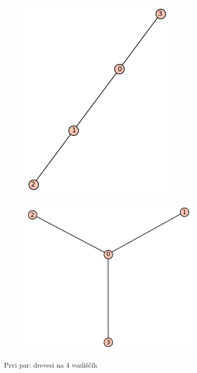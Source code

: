 \documentclass[12pt, a4paper]{article}
\begin{document}
\begin{center}
\begin{center}
\begin{figure}[!htb]
\centering
\begin{subfigure}{0.5\textwidth}
  \centering
  \includegraphics[width=0.4\linewidth]{t-3}
\end{subfigure}%
\begin{subfigure}{0.5\textwidth}
  \centering
  \includegraphics[width=0.5\linewidth]{t-4}
\end{subfigure}
\caption{Prvi par: drevesi na 4 vozliščih}
\label{fig:test}
\end{figure}
\end{center}


\end{center}
\end{document}
